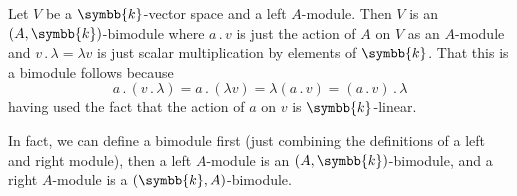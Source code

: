 \documentclass[fleqn]{NotesClass}
\renewcommand{\field}{\symbb{k}}
\newcommand{\action}{\mathbin{.}}
\begin{document}
    \begin{exm}{}{}
        Let \(V\) be a \(\field\)-vector space and a left \(A\)-module.
        Then \(V\) is an \((A, \field)\)-bimodule where \(a \action v\) is just the action of \(A\) on \(V\) as an \(A\)-module and \(v \action \lambda = \lambda v\) is just scalar multiplication by elements of \(\field\).
        That this is a bimodule follows because
        \begin{equation}
            a \action (v \action \lambda) = a \action (\lambda v) = \lambda (a \action v) = (a \action v) \action \lambda
        \end{equation}
        having used the fact that the action of \(a\) on \(v\) is \(\field\)-linear.
        
        In fact, we can define a bimodule first (just combining the definitions of a left and right module), then a left \(A\)-module is an \((A, \field)\)-bimodule, and a right \(A\)-module is a \((\field, A)\)-bimodule.
    \end{exm}
    
\end{document}
